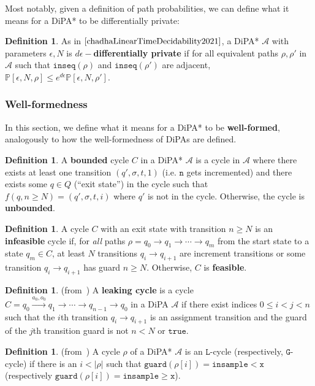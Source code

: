 \documentclass[12pt]{article}
\newcommand{\PP}{\mathbb{P}}
\newcommand{\gguard}{\texttt{insample}\geq \texttt{x}}
\newcommand{\lguard}{\texttt{insample} < \texttt{x}}
\theoremstyle{definition}
\newtheorem{defn}[thm]{Definition}
\begin{document}
Most notably, given a definition of path probabilities, we can define what it means for a DiPA* to be differentially private:
\begin{defn}
	As in $\cite{chadhaLinearTimeDecidability2021}$, a DiPA* $\mathcal{A}$ with parameters $\epsilon, N$ is \textbf{$d\epsilon-$differentially private} if for all equivalent paths $\rho, \rho'$ in $\mathcal{A}$ such that $\texttt{inseq}(\rho)$ and $\texttt{inseq}(\rho')$ are adjacent, $\PP[\epsilon, N, \rho] \leq e^{d\epsilon}\PP[\epsilon, N, \rho']$.
\end{defn}

\subsubsection{Well-formedness}

In this section, we define what it means for a DiPA* to be \textbf{well-formed}, analogously to how the well-formedness of DiPAs are defined.


\begin{defn}
A \textbf{bounded} cycle $C$ in a DiPA* $\mathcal{A}$ is a cycle in $\mathcal{A}$ where there exists at least one transition $(q', \sigma, t, 1)$ (i.e. $\texttt{n}$ gets incremented) and there exists some $q\in Q$ (``exit state'') in the cycle such that $f(q, n \geq N) = (q', \sigma, t, i)$ where $q'$ is not in the cycle. Otherwise, the cycle is \textbf{unbounded}. 
\end{defn}

\begin{defn}
A cycle $C$ with an exit state with transition $n\geq N$ is an \textbf{infeasible} cycle if, for \textit{all} paths $\rho = q_0\to q_1\to \cdots \to q_m$ from the start state to a state $q_m \in C$, at least $N$ transitions $q_i \to q_{i+1}$ are increment transitions or some transition $q_i \to q_{i+1}$ has guard $n\geq N$. Otherwise, $C$ is \textbf{feasible}.
\end{defn}

\begin{defn} (from~\cite{chadhaLinearTimeDecidability2021}) A \textbf{leaking cycle} is a cycle $C = q_0\xrightarrow{a_0, o_0}q_1\to \cdots\to q_{n-1}\to q_0$ in a DiPA $\mathcal{A}$ if there exist indices $0\leq i< j<n$ such that the $i$th transition $q_i\to q_{i+1}$ is an assignment transition and the guard of the $j$th transition guard is not $n < N$ or $\texttt{true}$. 
\end{defn}

\begin{defn} (from~\cite{chadhaLinearTimeDecidability2021}) A cycle $\rho$ of a DiPA* $\mathcal{A}$ is an $\texttt{L}$-cycle (respectively, $\texttt{G}$-cycle) if there is an $i < |\rho|$ such that $\texttt{guard}(\rho[i]) = \lguard$ (respectively $\texttt{guard}(\rho[i]) = \gguard$).
\end{defn}
\end{document}
